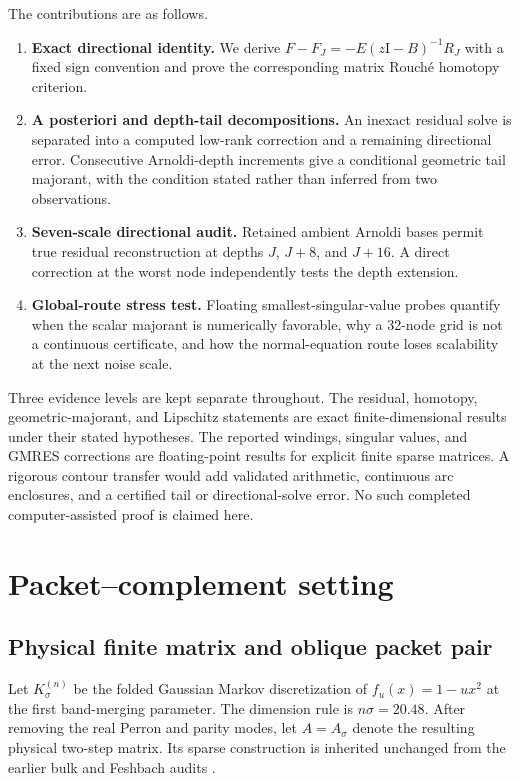 \documentclass[11pt]{article}
\theoremstyle{definition}
\theoremstyle{remark}
\newcommand{\Id}{\mathrm I}
\begin{document}
The contributions are as follows.

\begin{enumerate}[label=\textbf{D\arabic*.},leftmargin=2.8em]
 \item \textbf{Exact directional identity.}  We derive
 \(F-F_J=-E(z\Id-B)^{-1}R_J\) with a fixed sign convention and prove the
 corresponding matrix Rouch\'e homotopy criterion.
 \item \textbf{A posteriori and depth-tail decompositions.}  An inexact
 residual solve is separated into a computed low-rank correction and a
 remaining directional error.  Consecutive Arnoldi-depth increments give a
 conditional geometric tail majorant, with the condition stated rather
 than inferred from two observations.
 \item \textbf{Seven-scale directional audit.}  Retained ambient Arnoldi
 bases permit true residual reconstruction at depths \(J\), \(J+8\), and
 \(J+16\).  A direct correction at the worst node independently tests the
 depth extension.
 \item \textbf{Global-route stress test.}  Floating smallest-singular-value
 probes quantify when the scalar majorant is numerically favorable, why a
 32-node grid is not a continuous certificate, and how the normal-equation
 route loses scalability at the next noise scale.
\end{enumerate}

Three evidence levels are kept separate throughout.  The residual,
homotopy, geometric-majorant, and Lipschitz statements are exact
finite-dimensional results under their stated hypotheses.  The reported
windings, singular values, and GMRES corrections are floating-point results
for explicit finite sparse matrices.  A rigorous contour transfer would
add validated arithmetic, continuous arc enclosures, and a certified tail
or directional-solve error.  No such completed computer-assisted proof is
claimed here.

\section{Packet--complement setting}
\label{sec:setting}

\subsection{Physical finite matrix and oblique packet pair}

Let \(K_\sigma^{(n)}\) be the folded Gaussian Markov discretization of
\(f_u(x)=1-ux^2\) at the first band-merging parameter.  The dimension rule
is \(n\sigma=20.48\).  After removing the real Perron and parity modes, let
\(A=A_\sigma\) denote the resulting physical two-step matrix.  Its sparse
construction is inherited unchanged from the earlier bulk and Feshbach
audits \citep{WangBulkScattering2026,WangPhysicalFeshbach2026}.
\end{document}
